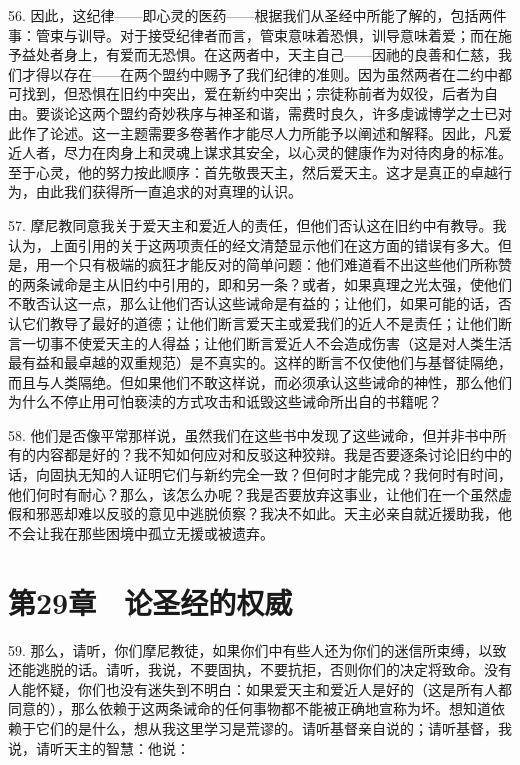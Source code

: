 56. 因此，这纪律——即心灵的医药——根据我们从圣经中所能了解的，包括两件事：管束与训导。对于接受纪律者而言，管束意味着恐惧，训导意味着爱；而在施予益处者身上，有爱而无恐惧。在这两者中，天主自己——因祂的良善和仁慈，我们才得以存在——在两个盟约中赐予了我们纪律的准则。因为虽然两者在二约中都可找到，但恐惧在旧约中突出，爱在新约中突出；宗徒称前者为奴役，后者为自由。要谈论这两个盟约奇妙秩序与神圣和谐，需费时良久，许多虔诚博学之士已对此作了论述。这一主题需要多卷著作才能尽人力所能予以阐述和解释。因此，凡爱近人者，尽力在肉身上和灵魂上谋求其安全，以心灵的健康作为对待肉身的标准。至于心灵，他的努力按此顺序：首先敬畏天主，然后爱天主。这才是真正的卓越行为，由此我们获得所一直追求的对真理的认识。\par

57. 摩尼教同意我关于爱天主和爱近人的责任，但他们否认这在旧约中有教导。我认为，上面引用的关于这两项责任的经文清楚显示他们在这方面的错误有多大。但是，用一个只有极端的疯狂才能反对的简单问题：他们难道看不出这些他们所称赞的两条诫命是主从旧约中引用的，即和另一条？或者，如果真理之光太强，使他们不敢否认这一点，那么让他们否认这些诫命是有益的；让他们，如果可能的话，否认它们教导了最好的道德；让他们断言爱天主或爱我们的近人不是责任；让他们断言一切事不使爱天主的人得益；让他们断言爱近人不会造成伤害（这是对人类生活最有益和最卓越的双重规范）是不真实的。这样的断言不仅使他们与基督徒隔绝，而且与人类隔绝。但如果他们不敢这样说，而必须承认这些诫命的神性，那么他们为什么不停止用可怕亵渎的方式攻击和诋毁这些诫命所出自的书籍呢？\par

58. 他们是否像平常那样说，虽然我们在这些书中发现了这些诫命，但并非书中所有的内容都是好的？我不知如何应对和反驳这种狡辩。我是否要逐条讨论旧约中的话，向固执无知的人证明它们与新约完全一致？但何时才能完成？我何时有时间，他们何时有耐心？那么，该怎么办呢？我是否要放弃这事业，让他们在一个虽然虚假和邪恶却难以反驳的意见中逃脱侦察？我决不如此。天主必亲自就近援助我，他不会让我在那些困境中孤立无援或被遗弃。\par


\section{第29章　论圣经的权威}

59. 那么，请听，你们摩尼教徒，如果你们中有些人还为你们的迷信所束缚，以致还能逃脱的话。请听，我说，不要固执，不要抗拒，否则你们的决定将致命。没有人能怀疑，你们也没有迷失到不明白：如果爱天主和爱近人是好的（这是所有人都同意的），那么依赖于这两条诫命的任何事物都不能被正确地宣称为坏。想知道依赖于它们的是什么，想从我这里学习是荒谬的。请听基督亲自说的；请听基督，我说，请听天主的智慧：他说： \par

